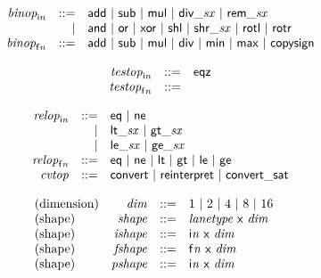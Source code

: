 $$
\begin{array}{@{}lrrl@{}l@{}}
& {{\mathit{binop}}}_{{\mathsf{i}}{{\mathit{n}}}} &::=& \mathsf{add} ~|~ \mathsf{sub} ~|~ \mathsf{mul} ~|~ {\mathsf{div\_}}{{\mathit{sx}}} ~|~ {\mathsf{rem\_}}{{\mathit{sx}}} \\ &&|&
\mathsf{and} ~|~ \mathsf{or} ~|~ \mathsf{xor} ~|~ \mathsf{shl} ~|~ {\mathsf{shr\_}}{{\mathit{sx}}} ~|~ \mathsf{rotl} ~|~ \mathsf{rotr} \\
& {{\mathit{binop}}}_{{\mathsf{f}}{{\mathit{n}}}} &::=& \mathsf{add} ~|~ \mathsf{sub} ~|~ \mathsf{mul} ~|~ \mathsf{div} ~|~ \mathsf{min} ~|~ \mathsf{max} ~|~ \mathsf{copysign} \\
\end{array}
$$

$$
\begin{array}{@{}lrrl@{}l@{}}
& {{\mathit{testop}}}_{{\mathsf{i}}{{\mathit{n}}}} &::=& \mathsf{eqz} \\
& {{\mathit{testop}}}_{{\mathsf{f}}{{\mathit{n}}}} &::=&  \\
\end{array}
$$

$$
\begin{array}{@{}lrrl@{}l@{}}
& {{\mathit{relop}}}_{{\mathsf{i}}{{\mathit{n}}}} &::=& \mathsf{eq} ~|~ \mathsf{ne} \\ &&|&
{\mathsf{lt\_}}{{\mathit{sx}}} ~|~ {\mathsf{gt\_}}{{\mathit{sx}}} \\ &&|&
{\mathsf{le\_}}{{\mathit{sx}}} ~|~ {\mathsf{ge\_}}{{\mathit{sx}}} \\
& {{\mathit{relop}}}_{{\mathsf{f}}{{\mathit{n}}}} &::=& \mathsf{eq} ~|~ \mathsf{ne} ~|~ \mathsf{lt} ~|~ \mathsf{gt} ~|~ \mathsf{le} ~|~ \mathsf{ge} \\
& {\mathit{cvtop}} &::=& \mathsf{convert} ~|~ \mathsf{reinterpret} ~|~ \mathsf{convert\_sat} \\
\end{array}
$$

\vspace{1ex}

$$
\begin{array}{@{}lrrl@{}l@{}}
\mbox{(dimension)} & {\mathit{dim}} &::=& 1 ~|~ 2 ~|~ 4 ~|~ 8 ~|~ 16 \\
\mbox{(shape)} & {\mathit{shape}} &::=& {\mathit{lanetype}}~\mathsf{x}~{\mathit{dim}} \\
\mbox{(shape)} & {\mathit{ishape}} &::=& {\mathsf{i}}{{\mathit{n}}}~\mathsf{x}~{\mathit{dim}} \\
\mbox{(shape)} & {\mathit{fshape}} &::=& {\mathsf{f}}{{\mathit{n}}}~\mathsf{x}~{\mathit{dim}} \\
\mbox{(shape)} & {\mathit{pshape}} &::=& {\mathsf{i}}{{\mathit{n}}}~\mathsf{x}~{\mathit{dim}} \\
\end{array}
$$

